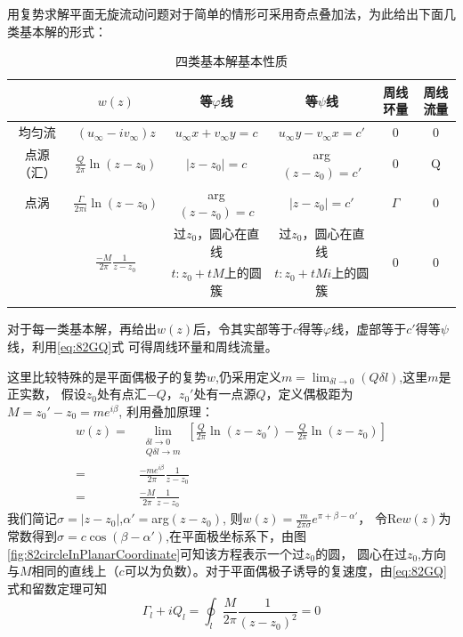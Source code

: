 用复势求解平面无旋流动问题对于简单的情形可采用奇点叠加法，为此给出下面几类基本解的形式：

\begin{table}[!ht]
\centering
\begin{tabular}{cccccc}
\Xhline{1pt}
&$w(z)$ &等$\varphi$线 & 等$\psi$线 & 周线环量 & 周线流量\\
\hline\noalign{\smallskip}
均匀流 & $(u_{\infty}-iv_{\infty})z$ & $u_{\infty}x+v_{\infty}y=c$ & $u_{\infty}y-v_{\infty}x=c'$ & 0 & 0 \\[0.1cm]
\hline\noalign{\smallskip}
点源（汇） & $\frac{Q}{2\pi} \ln(z-z_0)$ & $|z-z_0|=c$ & arg$(z-z_0)=c'$ & 0 & Q \\[0.1cm]
\hline\noalign{\smallskip}
点涡 & $\frac{\Gamma}{2\pi i} \ln(z-z_0)$ & arg$(z-z_0)=c$ & $|z-z_0|=c'$ & $\Gamma$ & 0 \\[0.1cm]
\hline\noalign{\smallskip}
\multirow{2}{*}{平面偶极子} & \multirow{2}{*}{$\frac{-M}{2\pi} \frac{1}{z-z_0}$} & 过$z_0$，圆心在直线 & 过$z_0$，圆心在直线 & \multirow{2}{*}{0} & \multirow{2}{*}{0} \\
& & $t:z_0+tM$上的圆簇 & $t:z_0+tMi$上的圆簇 & & \\[0.1cm]
\Xhline{1pt}
\end{tabular}
\caption{四类基本解基本性质}\label{tb:82FourBasic}
\end{table}

对于每一类基本解，再给出$w(z)$后，令其实部等于$c$得等$\varphi$线，虚部等于$c'$得等$\psi$线，利用\eqref{eq:82GQ}式
可得周线环量和周线流量。

这里比较特殊的是平面偶极子的复势$w$,仍采用定义$m=\displaystyle\lim_{\delta l \to 0}(Q\delta l)$,这里$m$是正实数，
假设$z_0$处有点汇$-Q$，$z_0'$处有一点源$Q$，定义偶极距为$M=z_0'-z_0=me^{i\beta}$,
利用叠加原理：
\begin{align*}
w(z)=&\lim\limits_{\substack{\delta l\to 0\\Q\delta l \to m}} \left[ \frac{Q}{2\pi}\ln(z-z_0') - \frac{Q}{2\pi}\ln(z-z_0) \right]\\
=& \frac{-m e^{i\beta}}{2\pi}\frac{1}{z-z_0}\\
=& \frac{-M}{2\pi} \frac{1}{z-z_0}
\end{align*}
我们简记$\sigma=|z-z_0|$,$\alpha'=$arg$(z-z_0)$, 则$w(z)=\frac{m}{2\pi\sigma}e^{\pi+\beta-\alpha'}$，
令Re$w(z)$为常数得到$\sigma=c\cos(\beta-\alpha')$,在平面极坐标系下，由图\ref{fig:82circleInPlanarCoordinate}可知该方程表示一个过$z_0$的圆，
圆心在过$z_0$,方向与$M$相同的直线上（$c$可以为负数）。对于平面偶极子诱导的复速度，由\eqref{eq:82GQ}式和留数定理可知
\begin{equation}
\Gamma_l + i Q_l = \oint_l \frac{M}{2\pi}\frac{1}{(z-z_0)^2}=0
\end{equation}

